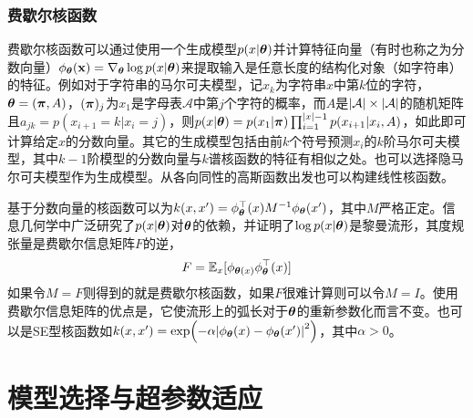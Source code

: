 \documentclass[12pt,UTF8]{article}
\begin{document}
            \subsubsection{费歇尔核函数}
                费歇尔核函数可以通过使用一个生成模型$p(x|\vb*{\theta})$并计算特征向量（有时也称之为分数向量）$\phi_{\vb*{\theta}}(\vb{x})=\nabla_{\vb*{\theta}}\log{p(x|\vb*{\theta})}$来提取输入是任意长度的结构化对象（如字符串）的特征。例如对于字符串的马尔可夫模型，记$x_k$为字符串$x$中第$k$位的字符，$\vb*{\theta}=(\vb*{\pi},A)$，$(\vb*{\pi})_j$为$x_1$是字母表$\mathcal{A}$中第$j$个字符的概率，而$A$是$\abs{\mathcal{A}}\times\abs{\mathcal{A}}$的随机矩阵且$a_{jk}=p(x_{i+1}=k|x_i=j)$，则$p(x|\vb*{\theta})=p(x_1|\vb*{\pi})\prod_{i=1}^{\abs{x}-1}{p(x_{i+1}|x_i,A)}$，如此即可计算给定$x$的分数向量。其它的生成模型包括由前$k$个符号预测$x_i$的$k$阶马尔可夫模型，其中$k-1$阶模型的分数向量与$k$谱核函数的特征有相似之处。也可以选择隐马尔可夫模型作为生成模型。从各向同性的高斯函数出发也可以构建线性核函数。\par
                基于分数向量的核函数可以为$k(x,x')=\phi_{\vb*{\theta}}^\top(x) M^{-1}\phi_{\vb*{\theta}}(x')$，其中$M$严格正定。信息几何学中广泛研究了$p(x|\vb*{\theta})$对$\vb*{\theta}$的依赖，并证明了$\log{p(x|\vb*{\theta})}$是黎曼流形，其度规张量是费歇尔信息矩阵$F$的逆，
                \begin{equation}
                    F=\mathbb{E}_x[\phi_{\vb*{\theta}(x)}\phi_{\vb*{\theta}}^\top(x)]
                \end{equation}
                如果令$M=F$则得到的就是费歇尔核函数，如果$F$很难计算则可以令$M=I$。使用费歇尔信息矩阵的优点是，它使流形上的弧长对于$\vb*{\theta}$的重新参数化而言不变。也可以是SE型核函数如$k(x,x')=\exp(-\alpha\abs{\phi_{\vb*{\theta}}(x)-\phi_{\vb*{\theta}}(x')}^2)$，其中$\alpha>0$。\par

    \section{模型选择与超参数适应}
\end{document}

